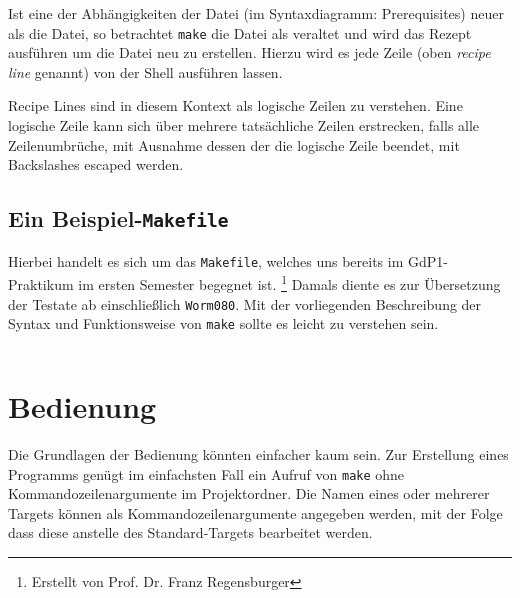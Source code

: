 		Ist eine der Abhängigkeiten der Datei (im Syntaxdiagramm: Prerequisites)
		neuer als die Datei, so betrachtet \texttt{make} die Datei als veraltet
		und wird das Rezept ausführen um die Datei neu zu erstellen. Hierzu wird
		es jede Zeile (oben \textit{recipe line} genannt) von der Shell
		ausführen lassen.

		Recipe Lines sind in diesem Kontext als logische Zeilen zu verstehen.
		Eine logische Zeile kann sich über mehrere tatsächliche Zeilen
		erstrecken, falls alle Zeilenumbrüche, mit Ausnahme dessen der die
		logische Zeile beendet, mit Backslashes escaped werden.

		\clearpage
		\subsection{Ein Beispiel-\texttt{Makefile}}
			\label{subsubsection:examplemakefile}

			Hierbei handelt es sich um das \texttt{Makefile}, welches uns
			bereits im GdP1-Praktikum im ersten Semester begegnet ist.
			\footnote{Erstellt von Prof. Dr. Franz Regensburger} Damals diente
			es zur Übersetzung der Testate ab einschließlich \texttt{Worm080}.
			Mit der vorliegenden Beschreibung der Syntax und Funktionsweise von
			\texttt{make} sollte es leicht zu verstehen sein.

			{
			\footnotesize
			\inputminted[linenos=true,stepnumber=5]{make}{../code/Worm080_Makefile}
			}

\section{Bedienung}

	Die Grundlagen der Bedienung könnten einfacher kaum sein.  Zur Erstellung
	eines Programms genügt im einfachsten Fall ein Aufruf von \texttt{make} ohne
	Kommandozeilenargumente im Projektordner.
	Die Namen eines oder mehrerer Targets können als Kommandozeilenargumente
	angegeben werden, mit der Folge dass diese anstelle des Standard-Targets
	bearbeitet werden.
